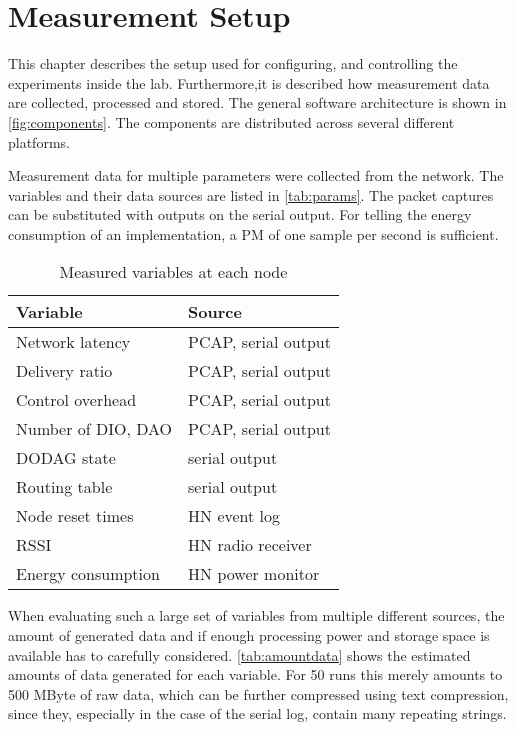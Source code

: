 \chapter{Measurement Setup}
\label{chap:setup}

This chapter describes the setup used for configuring, and controlling the
experiments inside the lab. Furthermore,it is described how measurement data are
collected, processed and stored. The general software architecture is shown in
\autoref{fig:components}. The components are distributed across several
different platforms.

Measurement data for multiple parameters were collected from the network. The
variables and their data sources are listed in \autoref{tab:params}. The packet
captures can be substituted with outputs on the serial output. For telling the
energy consumption of an implementation, a \ac{PM} of one sample per second is
sufficient.

\begin{table}[h]
  \centering
  \caption{Measured variables at each node}
  \begin{tabular}{ll}
    \toprule
    Variable & Source \\
    \midrule
    Network latency & PCAP, serial output \\
    Delivery ratio & PCAP, serial output \\
    Control overhead & PCAP, serial output \\
    Number of DIO, DAO & PCAP, serial output \\
    DODAG state & serial output \\
    Routing table & serial output \\
    Node reset times & HN event log \\
    RSSI & HN radio receiver \\
    Energy consumption & HN power monitor \\
  \end{tabular}
  \label{tab:params}
\end{table}

When evaluating such a large set of variables from multiple different sources,
the amount of generated data and if enough processing power and storage space is
available has to carefully considered. \autoref{tab:amountdata} shows the
estimated amounts of data generated for each variable. For 50 runs this merely
amounts to 500 MByte of raw data, which can be further compressed using text
compression, since they, especially in the case of the serial log, contain many
repeating strings.

